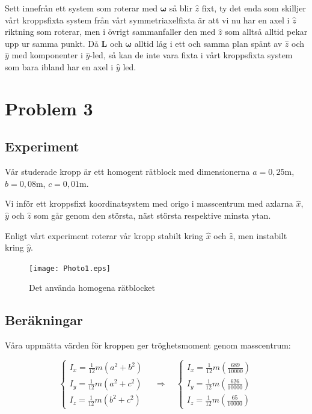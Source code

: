 \documentclass[12pt,a4paper]{article}
\begin{document}
		Sett innefrån ett system som roterar med $\boldsymbol{\omega}$ så blir $\hat{z}$ fixt, ty det enda som skilljer vårt kroppsfixta system från 
		vårt symmetriaxelfixta är att vi nu har en axel i $\hat{z}$ riktning som roterar, men i övrigt sammanfaller den med $\hat{z}$ som alltså alltid pekar upp ur samma punkt.
		Då $\mathbf{L}$ och $\boldsymbol{\omega}$ alltid låg i ett och samma plan spänt av $\hat{z}$ och $\hat{y}$ med komponenter i $\hat{y}$-led, så kan de inte vara fixta i vårt kroppsfixta system som bara ibland har en axel i $\hat{y}$ led.
		

	
\section{Problem 3}
	
	
	\subsection{Experiment}
		
		Vår studerade kropp är ett homogent rätblock med dimensionerna
		$a = 0,25 \mathrm{m}$, $b = 0,08 \mathrm{m}$, $c = 0,01 \mathrm{m}$.
		
		Vi inför ett kroppsfixt koordinatsystem med origo i masscentrum med axlarna
		$\hat{x}$, $\hat{y}$ och $\hat{z}$ som går genom den största, näst
		största respektive minsta ytan.
		
		Enligt vårt experiment roterar vår kropp stabilt kring $\hat{x}$ och $\hat{z}$, men
		instabilt kring $\hat{y}$.
		
		\begin{figure}
			\begin{center}
				\texttt{[image: Photo1.eps]}
				\caption{Det använda homogena rätblocket}
			\end{center}
		\end{figure}
		
	\subsection{Beräkningar}
		
		Våra uppmätta värden för kroppen ger tröghetsmoment genom masscentrum:
		
		\begin{equation*}
			\begin{cases}
				I_x = \frac{1}{12} m (a^2 + b^2) \\
				I_y = \frac{1}{12} m (a^2 + c^2) \\
				I_z = \frac{1}{12} m (b^2 + c^2) 
			\end{cases}
			\hspace{12pt}
			\Rightarrow
			\hspace{12pt}
			\begin{cases}
				I_x = \frac{1}{12} m (\frac{689}{10000}) \\
				I_y = \frac{1}{12} m (\frac{626}{10000}) \\
				I_z = \frac{1}{12} m (\frac{65}{10000})
			\end{cases}
		\end{equation*}
		
\end{document}
